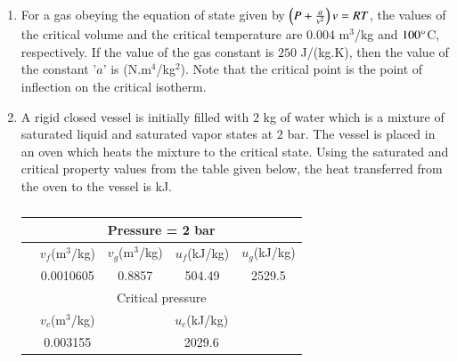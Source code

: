 \documentclass[a4paper,10pt]{article}
\begin{document}
\begin{enumerate}
    \item For a gas obeying the equation of state given by $\left(P + \frac{a}{v^2}\right)v = RT$, the values of the critical volume and the critical temperature are $0.004$ m$^3$/kg and $100 \degree$C, respectively. If the value of the gas constant is $250$ J/(kg.K), then the value of the constant '$a$' is \underline{\hspace{2cm}} (N.m$^4$/kg$^2$). Note that the critical point is the point of inflection on the critical isotherm.
    
    \hfill{}
    \begin{enumerate}
    \end{enumerate}

    \item A rigid closed vessel is initially filled with $2$ kg of water which is a mixture of saturated liquid and saturated vapor states at $2$ bar. The vessel is placed in an oven which heats the mixture to the critical state. Using the saturated and critical property values from the table given below, the heat transferred from the oven to the vessel is \underline{\hspace{2cm}} kJ.
    \begin{table}[h!] \centering \caption*{} \label{tab:q15_thermo}
        \begin{tabular}{|l|c|c|c|c|} \hline
            \multicolumn{5}{|c|}{Pressure = 2 bar} \\ \hline
            & $v_f$(m$^3$/kg) & $v_g$(m$^3$/kg) & $u_f$(kJ/kg) & $u_g$(kJ/kg) \\ \hline
            & 0.0010605 & 0.8857 & 504.49 & 2529.5 \\ \hline
            \multicolumn{5}{|c|}{Critical pressure} \\ \hline
            & $v_c$(m$^3$/kg) & \multicolumn{3}{c|}{$u_c$(kJ/kg)} \\ \hline
            & 0.003155 & \multicolumn{3}{c|}{2029.6} \\ \hline
        \end{tabular}
    \end{table}
    

\end{enumerate}
\end{document}
